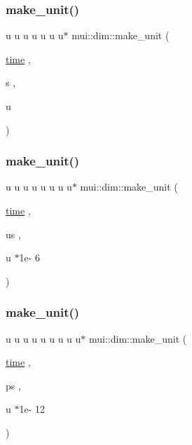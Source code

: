 \mbox{\label{namespacemui_1_1dim_ad0934027ae4940f2dfb316f629c8666f}} 
\subsubsection{\texorpdfstring{make\+\_\+unit()}{make\_unit()}\hspace{0.1cm}{\footnotesize\ttfamily [8/32]}}
{\footnotesize\ttfamily u u u u u u u$\ast$ mui\+::dim\+::make\+\_\+unit (\begin{DoxyParamCaption}\item[{\hyperlink{namespacemui_1_1dim_a3d3a0014025f1c2c0dd7418791928500}{time}}]{,  }\item[{s}]{,  }\item[{u}]{ }\end{DoxyParamCaption})}

\mbox{\label{namespacemui_1_1dim_ab4b29a62c60a57c7d82d4b720b5c60b2}} 
\subsubsection{\texorpdfstring{make\+\_\+unit()}{make\_unit()}\hspace{0.1cm}{\footnotesize\ttfamily [9/32]}}
{\footnotesize\ttfamily u u u u u u u u$\ast$ mui\+::dim\+::make\+\_\+unit (\begin{DoxyParamCaption}\item[{\hyperlink{namespacemui_1_1dim_a3d3a0014025f1c2c0dd7418791928500}{time}}]{,  }\item[{us}]{,  }\item[{u $\ast$1e-\/}]{6 }\end{DoxyParamCaption})}

\mbox{\label{namespacemui_1_1dim_ae32f3eb97742ea3c53455e5dfabbfcf6}} 
\subsubsection{\texorpdfstring{make\+\_\+unit()}{make\_unit()}\hspace{0.1cm}{\footnotesize\ttfamily [10/32]}}
{\footnotesize\ttfamily u u u u u u u u u$\ast$ mui\+::dim\+::make\+\_\+unit (\begin{DoxyParamCaption}\item[{\hyperlink{namespacemui_1_1dim_a3d3a0014025f1c2c0dd7418791928500}{time}}]{,  }\item[{ps}]{,  }\item[{u $\ast$1e-\/}]{12 }\end{DoxyParamCaption})}

